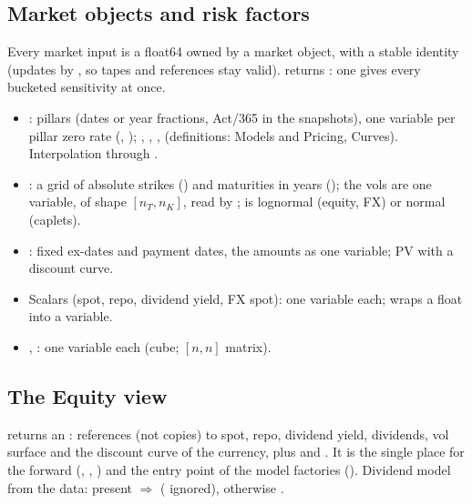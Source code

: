\subsection{Market objects and risk factors}\label{sec:arch-risk-factors}
Every market input is a float64  owned by a market object, with a stable identity (updates by
, so tapes and references stay valid).  returns
: one  gives every bucketed
sensitivity at once.
\begin{itemize}[nosep]
  \item {}: pillars (dates or year fractions, Act/365 in the snapshots), one variable per pillar zero
        rate (, ); , , ,
         (definitions: Models and Pricing, Curves). Interpolation  through
        .
  \item {}: a grid of absolute strikes () and maturities in years
        (); the vols are one variable,  of shape $[n_T, n_K]$, read by
        ;  is lognormal (equity, FX) or normal (caplets).
  \item {}: fixed ex-dates and payment dates, the amounts as one variable; PV with a discount curve.
  \item Scalars (spot, repo, dividend yield, FX spot): one variable each;  wraps a float
        into a variable.
  \item {}, : one variable each (cube; $[n, n]$ matrix).
\end{itemize}

\subsection{The Equity view}\label{sec:arch-equity}
 returns an : references (not copies) to spot, repo, dividend
yield, dividends, vol surface and the discount curve of the currency, plus  and . It is
the single place for the forward (, , ) and the entry
point of the model factories (). Dividend model from the data:  present $\Rightarrow$
 ( ignored), otherwise .
 

